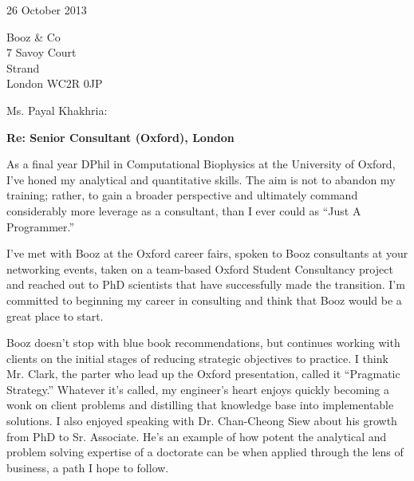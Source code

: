 \documentclass{../res}
\begin{document}
 
\begin{sloppypar}
 
%


\begin{resume} 
 
\vspace{1\baselineskip}

26 October 2013
\vspace{1\baselineskip}

Booz \& Co \\
7 Savoy Court \\
Strand \\
London WC2R 0JP
\vspace{1\baselineskip}

Ms. Payal Khakhria: %

\textbf{Re: Senior Consultant (Oxford), London}

As a final year DPhil in Computational Biophysics at the University of Oxford, I've honed my analytical and quantitative skills. The aim is not to abandon my training; rather, to gain a broader perspective and ultimately command considerably more leverage as a consultant, than I ever could as ``Just A Programmer.''

I've met with Booz at the Oxford career fairs, spoken to Booz consultants at your networking events, taken on a team-based Oxford Student Consultancy project and reached out to PhD scientists that have successfully made the transition. I'm committed to beginning my career in consulting and think that Booz would be a great place to start.

Booz doesn't stop with blue book recommendations, but continues working with clients on the initial stages of reducing strategic objectives to practice. I think Mr. Clark, the parter who lead up the Oxford presentation, called it ``Pragmatic Strategy.'' Whatever it's called, my engineer's heart enjoys quickly becoming a wonk on client problems and distilling that knowledge base into implementable solutions. I also enjoyed speaking with Dr. Chan-Cheong Siew about his growth from PhD to Sr. Associate. He's an example of how potent the analytical and problem solving expertise of a doctorate can be when applied through the lens of business, a path I hope to follow.


\end{resume}
\end{sloppypar}
\end{document}
